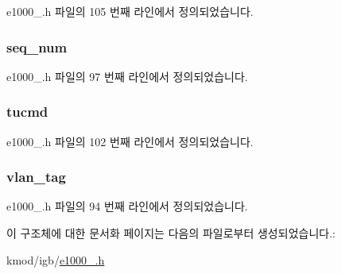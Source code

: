 e1000\+\_.\+h 파일의 105 번째 라인에서 정의되었습니다.

\subsubsection[{\texorpdfstring{seq\+\_\+num}{seq_num}}]{ seq\+\_\+num}\hypertarget{structe1000__adv__context__desc_ae09302774fdcd17cbc66c6ba2a730aae}{}\label{structe1000__adv__context__desc_ae09302774fdcd17cbc66c6ba2a730aae}


e1000\+\_.\+h 파일의 97 번째 라인에서 정의되었습니다.

\subsubsection[{\texorpdfstring{tucmd}{tucmd}}]{ tucmd}\hypertarget{structe1000__adv__context__desc_a7630b3dac4bab02ebaf715bb8ecc1e9e}{}\label{structe1000__adv__context__desc_a7630b3dac4bab02ebaf715bb8ecc1e9e}


e1000\+\_.\+h 파일의 102 번째 라인에서 정의되었습니다.

\subsubsection[{\texorpdfstring{vlan\+\_\+tag}{vlan_tag}}]{ vlan\+\_\+tag}\hypertarget{structe1000__adv__context__desc_ad138117406ef0e1d6c7cfc0ac55eb838}{}\label{structe1000__adv__context__desc_ad138117406ef0e1d6c7cfc0ac55eb838}


e1000\+\_.\+h 파일의 94 번째 라인에서 정의되었습니다.



이 구조체에 대한 문서화 페이지는 다음의 파일로부터 생성되었습니다.\+:\begin{DoxyCompactItemize}
\item 
kmod/igb/\hyperlink{kmod_2igb_2e1000__82575_8h}{e1000\+\_.\+h}\end{DoxyCompactItemize}

